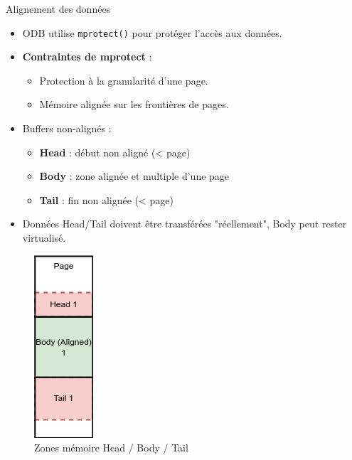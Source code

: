 \documentclass[aspectratio=43,8pt]{beamer}
\begin{document}
\begin{frame}{Alignement des données}
\begin{itemize}
    \item ODB utilise \texttt{mprotect()} pour protéger l'accès aux données.
    \item \textbf{Contraintes de mprotect} :
    \begin{itemize}
        \item Protection à la granularité d'une page.
        \item Mémoire alignée sur les frontières de pages.
    \end{itemize}
    \item Buffers non-alignés :
    \begin{itemize}
        \item \textbf{Head} : début non aligné (< page)
        \item \textbf{Body} : zone alignée et multiple d'une page
        \item \textbf{Tail} : fin non alignée (< page)
    \end{itemize}
    \item Données Head/Tail doivent être transférées "réellement", Body peut rester virtualisé.
\end{itemize}
\begin{figure}
    \centering
    \includegraphics[scale=0.4]{img2/memory_pb.png}
    \caption{Zones mémoire Head / Body / Tail}
\end{figure}
\end{frame}
\end{document}
